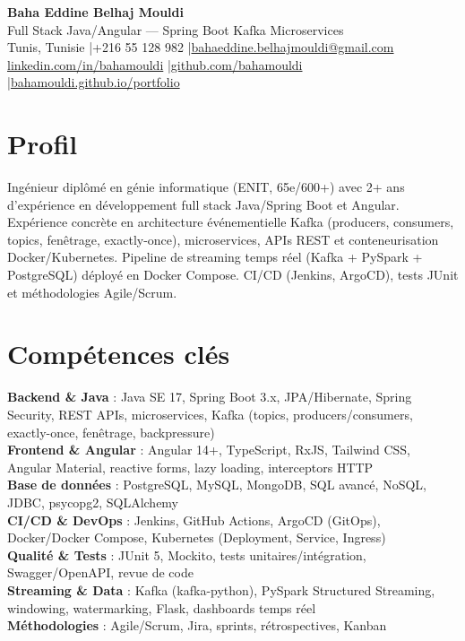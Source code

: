 \documentclass[a4paper,10pt]{article}
\begin{document}
\begin{center}
{\LARGE\bfseries\color{navy} Baha Eddine Belhaj Mouldi}\\[3pt]
{\large Full Stack Java/Angular --- Spring Boot \textbar Kafka \textbar Microservices}\\[4pt]
Tunis, Tunisie \quad|\quad +216 55 128 982 \quad|\quad \href{mailto:bahaeddine.belhajmouldi@gmail.com}{bahaeddine.belhajmouldi@gmail.com}\\[1pt]
\href{https://www.linkedin.com/in/bahamouldi}{linkedin.com/in/bahamouldi} \quad|\quad \href{https://github.com/bahamouldi}{github.com/bahamouldi} \quad|\quad \href{https://bahamouldi.github.io/portfolio/}{bahamouldi.github.io/portfolio}
\end{center}
\vspace{2pt}
\section{Profil}
Ingénieur diplômé en génie informatique (ENIT, 65e/600+) avec 2+ ans d'expérience en développement full stack Java/Spring Boot et Angular. Expérience concrète en architecture événementielle Kafka (producers, consumers, topics, fenêtrage, exactly-once), microservices, APIs REST et conteneurisation Docker/Kubernetes. Pipeline de streaming temps réel (Kafka + PySpark + PostgreSQL) déployé en Docker Compose. CI/CD (Jenkins, ArgoCD), tests JUnit et méthodologies Agile/Scrum.

\section{Compétences clés}
\textbf{Backend \& Java} : Java SE 17, Spring Boot 3.x, JPA/Hibernate, Spring Security, REST APIs, microservices, Kafka (topics, producers/consumers, exactly-once, fenêtrage, backpressure)\\[0.5pt]
\textbf{Frontend \& Angular} : Angular 14+, TypeScript, RxJS, Tailwind CSS, Angular Material, reactive forms, lazy loading, interceptors HTTP\\[0.5pt]
\textbf{Base de données} : PostgreSQL, MySQL, MongoDB, SQL avancé, NoSQL, JDBC, psycopg2, SQLAlchemy\\[0.5pt]
\textbf{CI/CD \& DevOps} : Jenkins, GitHub Actions, ArgoCD (GitOps), Docker/Docker Compose, Kubernetes (Deployment, Service, Ingress)\\[0.5pt]
\textbf{Qualité \& Tests} : JUnit 5, Mockito, tests unitaires/intégration, Swagger/OpenAPI, revue de code\\[0.5pt]
\textbf{Streaming \& Data} : Kafka (kafka-python), PySpark Structured Streaming, windowing, watermarking, Flask, dashboards temps réel\\[0.5pt]
\textbf{Méthodologies} : Agile/Scrum, Jira, sprints, rétrospectives, Kanban
\end{document}
